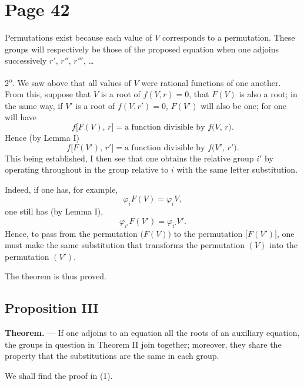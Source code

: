 \documentclass{article}
\begin{document}
\section*{Page 42}

Permutations exist because each value of $V$ corresponds to a permutation. These groups will respectively be those of the proposed equation when one adjoins successively $r'$, $r''$, $r'''$, \dots

2\textsuperscript{o}. We saw above that all values of $V$ were rational functions of one another. From this, suppose that $V$ is a root of $f(V,r)=0$, that $F(V)$ is also a root; in the same way, if $V'$ is a root of $f(V,r')=0$, $F(V')$ will also be one; for one will have
\[
f\bigl[F(V),\,r\bigr] = \text{a function divisible by } f\bigl(V,\,r\bigr).
\]
Hence (by Lemma I)
\[
f\bigl[F(V'),\,r'\bigr] = \text{a function divisible by } f\bigl(V',\,r'\bigr).
\]
This being established, I then see that one obtains the relative group $i'$ by operating throughout in the group relative to $i$ with the same letter substitution.

Indeed, if one has, for example,
\[
\varphi_{i} F(V) = \varphi_{i} V,
\]
one still has (by Lemma I),
\[
\varphi_{i'} F(V') = \varphi_{i'} V'.
\]
Hence, to pass from the permutation $\bigl(F(V)\bigr)$ to the permutation $\bigl[F(V')\bigr]$, one must make the same substitution that transforms the permutation $(V)$ into the permutation $(V')$.

The theorem is thus proved.

\subsection*{Proposition III}

\textbf{Theorem.} --- If one adjoins to an equation all the roots of an auxiliary equation, the groups in question in Theorem II join together; moreover, they share the property that the substitutions are the same in each group.

We shall find the proof in (1).

\end{document}
